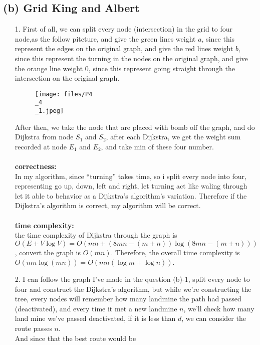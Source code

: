 \documentclass{homework}
\begin{document}
\subsection*{(b) Grid King and Albert}
\begin{itemize}
    \item[1.]
        First of all, we can split every node (intersection) in the grid to four node,as the follow pitcture, and give the green lines weight $a$, since this represent the edges on the original graph, and give the red lines  weight $b$, since this represent the turning in the nodes on the original graph, and give the orange line weight $0$, since this represent going straight through the intersection on the original graph.
        \begin{figure}[H]
            \centering
            \texttt{[image: files/P4\\\_4\\\_1.jpeg]}
        \end{figure}
        After then, we take the node that are placed with bomb off the graph, and do Dijkstra from node $S_1$ and $S_2$, after each Dijkstra, we get the weight sum recorded at node $E_1$ and $E_2$, and take min of these four number.\\\\
        \textbf{correctness: }\\
        In my algorithm, since ``turning'' takes time, so i split every node into four, representing go up, down, left and right, let turning act like waling through let it able to behavior as a Dijkstra's algorithm's variation. Therefore if the Dijkstra's algorithm is correct, my algorithm will be correct.\\\\
        \textbf{time complexity:}\\
        the time complexity of Dijkstra through the graph is $O(E + V\log V) = O(mn+ (8mn-(m+n))\log (8mn-(m+n)))$, convert the graph is $O(mn)$. Therefore, the overall time complexity is $O(mn\log (mn)) = O(mn(\log m+\log n))$.
\clearpage
    \item[2.]
    I can follow the graph I've made in the question (b)-1, split every node to four and construct the Dijkstra's algorithm, but while we're constructing the tree, every nodes will remember how many landmine the path had passed (deactivated), and every time it met a new landmine $n$, we'll check how many land mine we've passed deactivated, if it is less than $d$, we can consider the route passes $n$.\\
    And since that the best route would be 

\end{itemize}
\end{document}
